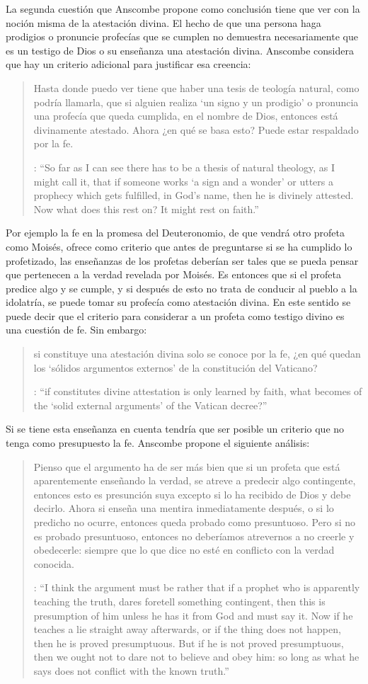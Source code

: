 La segunda cuestión que Anscombe propone como conclusión tiene que ver con la noción misma de la atestación divina. El hecho de que una persona haga prodigios o pronuncie profecías que se cumplen no demuestra necesariamente que es un testigo de Dios o su enseñanza una atestación divina. Anscombe considera que hay un criterio adicional para justificar esa creencia: \blockquote[{\cite[38]{anscombe2008faith:prophandmi}}: \enquote{So far as I can see there has to be a thesis of natural theology, as I might call it, that if someone works `a sign and a wonder' or utters a prophecy which gets fulfilled, in God's name, then he is divinely attested. Now what does this rest on? It might rest on faith.}]{Hasta donde puedo ver tiene que haber una tesis de teología natural, como podría llamarla, que si alguien realiza `un signo y un prodigio' o pronuncia una profecía que queda cumplida, en el nombre de Dios, entonces está divinamente atestado. Ahora ¿en qué se basa esto? Puede estar respaldado por la fe.} Por ejemplo la fe en la promesa del Deuteronomio, de que vendrá otro profeta como Moisés, ofrece como criterio que antes de preguntarse si se ha cumplido lo profetizado, las enseñanzas de los profetas deberían ser tales que se pueda pensar que pertenecen a la verdad revelada por Moisés. Es entonces que si el profeta predice algo y se cumple, y si después de esto no trata de conducir al pueblo a la idolatría, se puede tomar su profecía como atestación divina. En este sentido se puede decir que el criterio para considerar a un profeta como testigo divino es una cuestión de fe. Sin embargo: \blockquote[{\cite[38]{anscombe2008faith:prophandmi}}: \enquote{if  constitutes divine attestation is only learned by faith, what becomes of the `solid external arguments' of the Vatican decree?}]{si  constituye una atestación divina solo se conoce por la fe, ¿en qué quedan los `sólidos argumentos externos' de la constitución del Vaticano?}. Si se tiene esta enseñanza en cuenta tendría que ser posible un criterio que no tenga como presupuesto la fe. Anscombe propone el siguiente análisis: \blockquote[{\cite[38]{anscombe2008faith:prophandmi}}: \enquote{I think the argument must be rather that if a prophet who is apparently teaching the truth, dares foretell something contingent, then this is presumption of him unless he has it from God and must say it. Now if he teaches a lie straight away afterwards, or if the thing does not happen, then he is proved presumptuous. But if he is not proved presumptuous, then we ought not to dare not to believe and obey him: so long as what he says does not conflict with the known truth.}]{Pienso que el argumento ha de ser más bien que si un profeta que está aparentemente enseñando la verdad, se atreve a predecir algo contingente, entonces esto es presunción suya excepto si lo ha recibido de Dios y debe decirlo. Ahora si enseña una mentira inmediatamente después, o si lo predicho no ocurre, entonces queda probado como presuntuoso. Pero si no es probado presuntuoso, entonces no deberíamos atrevernos a no creerle y obedecerle: siempre que lo que dice no esté en conflicto con la verdad conocida.}

